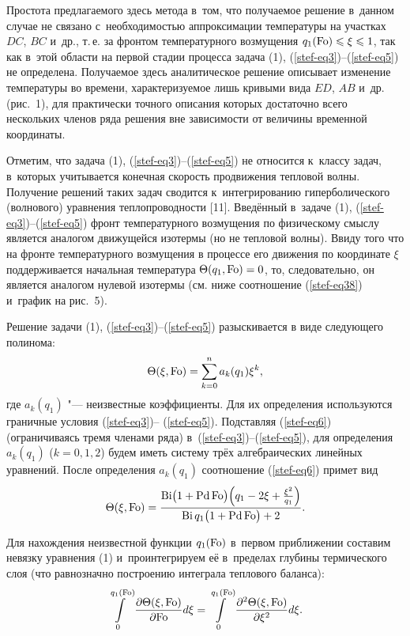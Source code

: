 Простота предлагаемого здесь метода в~том, что получаемое решение в~данном 
случае не связано с~необходимостью аппроксимации температуры на участках $DC$, 
$BC$ и~др., т.\,е. за фронтом температурного возмущения $q_1 ({\rm Fo})\leqslant \xi \leqslant 1$, так как в~этой области 
на первой стадии процесса задача (1), (\ref{stef-eq3})--(\ref{stef-eq5}) не определена. Получаемое 
здесь аналитическое решение описывает изменение температуры во времени, 
характеризуемое лишь кривыми вида $ED$, $AB$ и~др. (рис.~1), для практически 
точного описания которых достаточно всего нескольких членов ряда решения вне 
зависимости от величины временной координаты.

Отметим, что задача (1), (\ref{stef-eq3})--(\ref{stef-eq5}) не относится к~классу задач, в~которых 
учитывается конечная скорость продвижения тепловой волны. Получение решений 
таких задач сводится к~интегрированию гиперболического (волнового) уравнения 
теплопроводности [11]. Введённый в~задаче (1), (\ref{stef-eq3})--(\ref{stef-eq5}) фронт 
температурного возмущения по физическому смыслу является аналогом движущейся 
изотермы (но не тепловой волны). Ввиду того что на фронте температурного 
возмущения в процессе его движения по координате $\xi $ поддерживается 
начальная температура $ \Theta (q_1, {\rm Fo})=0$, то, следовательно, он является аналогом нулевой 
изотермы (см. ниже соотношение (\ref{stef-eq38}) и~график на рис.~5). 

Решение задачи (1), (\ref{stef-eq3})--(\ref{stef-eq5}) разыскивается в виде следующего полинома:
\begin{equation}
\label{stef-eq6}
\Theta (\xi, {\rm Fo})=\sum\limits_{k=0}^n a_k 
(q_1 )\xi ^k,
\end{equation}
где $a_k (q_1 ) $ "--- неизвестные коэффициенты. Для их 
определения используются граничные условия (\ref{stef-eq3})-- (\ref{stef-eq5}). 
Подставляя (\ref{stef-eq6}) 
(ограничиваясь тремя членами ряда) в~(\ref{stef-eq3})--(\ref{stef-eq5}), для определения 
$a_k (q_1 )$ ($k=0, 1,  2$) 
будем иметь систему трёх алгебраических линейных уравнений. После 
определения $a_k (q_1 )$ соотношение (\ref{stef-eq6}) примет вид
\begin{equation}
\label{stef-eq7}
\Theta (\xi, {\rm Fo})=
\frac{{\rm Bi}\bigl( 1+{\rm Pd}\,{\rm Fo}\bigr)\Bigr( q_1 -2\xi +\frac{\xi ^2}{q_1 } \Bigr)} 
{{\rm Bi}\,q_1 
\bigl( 1+{\rm Pd}\,{\rm Fo} \bigr)+2}.
\end{equation}



Для нахождения неизвестной функции $q_1 ({\rm Fo})$ в~первом 
приближении составим невязку уравнения (1) и~проинтегрируем её в~пределах 
глубины термического слоя (что равнозначно построению интеграла теплового 
баланса):
\begin{equation}
\label{stef-eq8}
\int\limits_0^{q_1 ({\rm Fo})} 
\frac{\partial \Theta (\xi, {\rm Fo})}{\partial {\rm Fo}} d\xi =
\int\limits_0^{q_1 ({\rm Fo})} 
\frac{\partial^2\Theta (\xi, {\rm Fo}) }{\partial \xi ^2} d\xi.
\end{equation}




